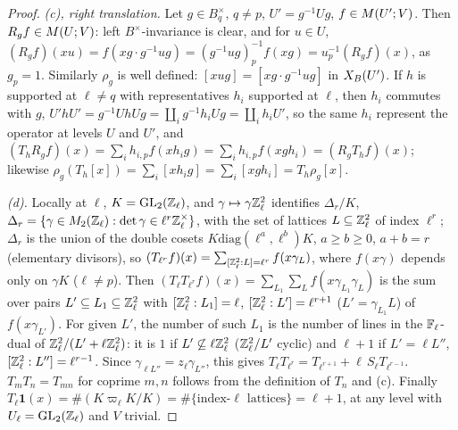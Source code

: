 \begin{proof}
\emph{(c), right translation.} Let $g\in B_q^\times$, $q\ne p$, $U'=g^{-1}Ug$, $f\in M(U';V)$. Then $R_gf\in M(U;V)$: left
$B^\times$-invariance is clear, and for $u\in U$, $(R_gf)(xu)=f(xg\cdot g^{-1}ug)=(g^{-1}ug)_p^{-1}f(xg)=u_p^{-1}(R_gf)(x)$, as $g_p=1$.
Similarly $\rho_g$ is well defined: $[xug]=[xg\cdot g^{-1}ug]$ in $X_B(U')$. If $h$ is supported at $\ell\ne q$ with representatives $h_i$
supported at $\ell$, then $h_i$ commutes with $g$, $U'hU'=g^{-1}UhUg=\coprod_ig^{-1}h_iUg=\coprod_ih_iU'$, so the same $h_i$ represent the
operator at levels $U$ and $U'$, and
$(T_hR_gf)(x)=\sum_ih_{i,p}f(xh_ig)=\sum_ih_{i,p}f(xgh_i)=(R_gT_hf)(x)$; likewise $\rho_g(T_h[x])=\sum_i[xh_ig]=\sum_i[xgh_i]=T_h\rho_g[x]$.

\emph{(d).} Locally at $\ell$, $K=\mathrm{GL}_2(\mathbb{Z}_\ell)$, and $\gamma\mapsto\gamma\mathbb{Z}_\ell^2$ identifies $\Delta_r/K$, $\Delta_r=\{\gamma\in M_2(\mathbb{Z}_\ell):\det\gamma\in\ell^r\mathbb{Z}_\ell^\times\}$,
with the set of lattices $L\subseteq\mathbb{Z}_\ell^2$ of index $\ell^r$; $\Delta_r$ is the union of the double cosets
$K\mathrm{diag}(\ell^a,\ell^b)K$, $a\ge b\ge0$, $a+b=r$ (elementary divisors), so $(T_{\ell^r}f)(x)=\sum_{[\mathbb{Z}_\ell^2:L]=\ell^r}f(x\gamma_L)$, where
$f(x\gamma)$ depends only on $\gamma K$ ($\ell\ne p$). Then $(T_\ell T_{\ell^r}f)(x)=\sum_{L_1}\sum_Lf(x\gamma_{L_1}\gamma_L)$ is the sum over pairs
$L'\subseteq L_1\subseteq\mathbb{Z}_\ell^2$ with $[\mathbb{Z}_\ell^2:L_1]=\ell$, $[\mathbb{Z}_\ell^2:L']=\ell^{r+1}$ ($L'=\gamma_{L_1}L$) of $f(x\gamma_{L'})$. For given $L'$, the
number of such $L_1$ is the number of lines in the $\mathbb{F}_\ell$-dual of $\mathbb{Z}_\ell^2/(L'+\ell\mathbb{Z}_\ell^2)$: it is $1$ if $L'\not\subseteq\ell\mathbb{Z}_\ell^2$
($\mathbb{Z}_\ell^2/L'$ cyclic) and $\ell+1$ if $L'=\ell L''$, $[\mathbb{Z}_\ell^2:L'']=\ell^{r-1}$. Since $\gamma_{\ell L''}=z_\ell\gamma_{L''}$, this gives
$T_\ell T_{\ell^r}=T_{\ell^{r+1}}+\ell\,S_\ell T_{\ell^{r-1}}$. $T_mT_n=T_{mn}$ for coprime $m,n$ follows from the definition of $T_n$ and (c).
Finally $T_\ell\mathbf 1(x)=\#(K\varpi_\ell K/K)=\#\{\text{index-}\ell\text{ lattices}\}=\ell+1$, at any level with $U_\ell=\mathrm{GL}_2(\mathbb{Z}_\ell)$ and $V$ trivial.
\end{proof}

